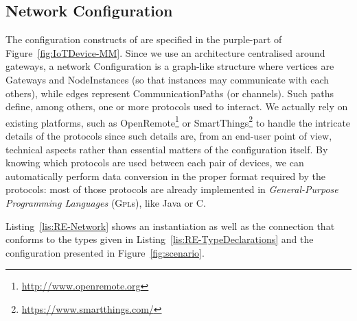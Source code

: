 \subsection{Network Configuration}
\label{sec:IoTDSL-NetworkConfiguration}

The configuration constructs of \IOTDSL are specified in the purple-part of Figure~\ref{fig:IoTDevice-MM}. Since we use an architecture centralised around gateways, a network \textsf{Configuration} is a graph-like structure where vertices are \textsf{Gateway}s and \textsf{NodeInstance}s (so that instances may communicate with each others), while edges represent \textsf{CommunicationPath}s (or channels). Such paths define, among others, one or more protocols used to interact. We actually rely on existing platforms, such as OpenRemote\footnote{\url{http://www.openremote.org}} or SmartThings\footnote{\url{https://www.smartthings.com/}} to handle the intricate details of the protocols since such details are, from an end-user point of view, technical aspects rather than essential matters of the configuration itself. By knowing which protocols are used between each pair of devices, we can automatically perform data conversion in the proper format required by the protocols: most of those protocols are already implemented in \textit{General-Purpose Programming Languages} (\textsc{Gpl}s), like Java or C.

Listing~\ref{lis:RE-Network} shows an instantiation as well as the connection that conforms to the types given in Listing~\ref{lis:RE-TypeDeclarations} and the configuration presented in Figure~\ref{fig:scenario}.
	

